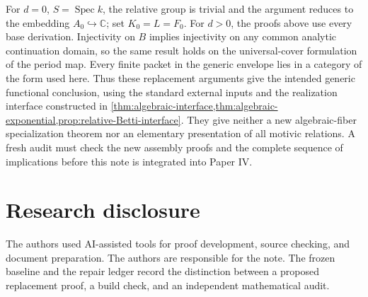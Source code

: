 \documentclass[11pt]{article}
\numberwithin{equation}{section}
\theoremstyle{definition}
\theoremstyle{remark}
\newcommand{\C}{\mathbb C}
\newcommand{\Spec}{\operatorname{Spec}}
\begin{document}
For $d=0$, $S=\Spec k$, the relative group is trivial and the argument
reduces to the embedding $A_0\hookrightarrow\C$; set $K_0=L=F_0$.
For $d>0$, the proofs above use every base derivation. Injectivity on $B$
implies injectivity on any common analytic continuation domain, so the
same result holds on the universal-cover formulation of the period map.
Every finite packet in the generic envelope lies in a category of the form
used here. Thus these replacement arguments give the intended generic
functional conclusion, using the standard external inputs
and the realization interface constructed in
\cref{thm:algebraic-interface,thm:algebraic-exponential,prop:relative-Betti-interface}.
They give neither a new algebraic-fiber
specialization theorem nor an elementary presentation of all motivic
relations. A fresh audit must check the new assembly proofs and the complete
sequence of implications before this note is integrated into Paper IV.

\section*{Research disclosure}
The authors used AI-assisted tools for proof development, source checking,
and document preparation. The authors are responsible for the note. The
frozen baseline and the repair ledger record the distinction between a
proposed replacement proof, a build check, and an independent mathematical
audit.
\end{document}
